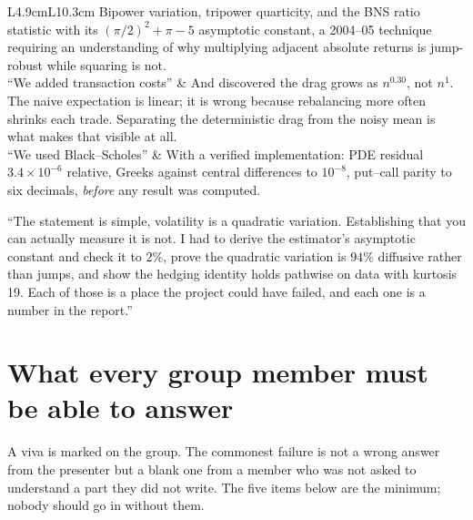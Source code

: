 \documentclass[11pt,a4paper]{article}
\begin{document}
\begin{table}[H]
\begin{tabular}{L{4.9cm}L{10.3cm}}
Bipower variation, tripower quarticity, and the BNS ratio statistic with its
$(\pi/2)^2+\pi-5$ asymptotic constant, a 2004--05 technique requiring an understanding of
why multiplying adjacent absolute returns is jump-robust while squaring is not. \\
\addlinespace
``We added transaction costs'' &
And discovered the drag grows as $n^{0.30}$, not $n^{1}$. The naive expectation is linear;
it is wrong because rebalancing more often shrinks each trade. Separating the deterministic
drag from the noisy mean is what makes that visible at all. \\
\addlinespace
``We used Black--Scholes'' &
With a verified implementation: PDE residual $3.4\times10^{-6}$ relative, Greeks against
central differences to $10^{-8}$, put--call parity to six decimals, \emph{before} any result
was computed. \\
\bottomrule
\end{tabular}
\end{table}

\begin{saybox}
``The statement is simple, volatility is a quadratic variation. Establishing that you can
actually measure it is not. I had to derive the estimator's asymptotic constant and check it to
$2\%$, prove the quadratic variation is $94\%$ diffusive rather than jumps, and show the
hedging identity holds pathwise on data with kurtosis 19. Each of those is a place the project
could have failed, and each one is a number in the report.''
\end{saybox}

\section{What every group member must be able to answer}
\label{sec:group}

A viva is marked on the group. The commonest failure is not a wrong answer from the presenter
but a blank one from a member who was not asked to understand a part they did not write. The
five items below are the minimum; nobody should go in without them.
\end{document}
